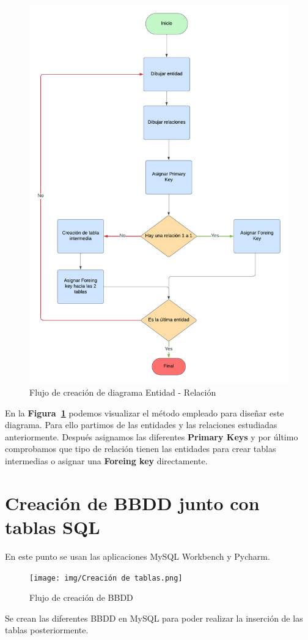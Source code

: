 \documentclass[a4paper, 12pt]{book}
\begin{document}
\begin{figure}
	\centering
	\includegraphics[width=15cm, keepaspectratio]{img/Creacion diagrama.png}
	\caption{Flujo de creación de diagrama Entidad - Relación}
	\label{fig:flujo creacion de diagrama}
\end{figure}

En la \textbf {Figura~\ref{fig:flujo creacion de diagrama}} podemos visualizar el método empleado para diseñar este diagrama. Para ello partimos de las entidades y las relaciones estudiadas anteriormente. Después asignamos las diferentes \textbf {Primary Keys} y por último comprobamos que tipo de relación tienen las entidades para crear tablas intermedias o asignar una \textbf {Foreing key} directamente.

\section{Creación de BBDD junto con tablas SQL} 
\label{sec:creacion_BBDD}
En este punto se usan las aplicaciones MySQL Workbench y Pycharm.
\begin{figure}
	\centering
	\texttt{[image: img/Creación de tablas.png]}
	\caption{Flujo de creación de BBDD}
	\label{fig:flujo creacion BBDD}
\end{figure}
Se crean las diferentes BBDD en MySQL para poder realizar la inserción de las tablas posteriormente.
\end{document}
